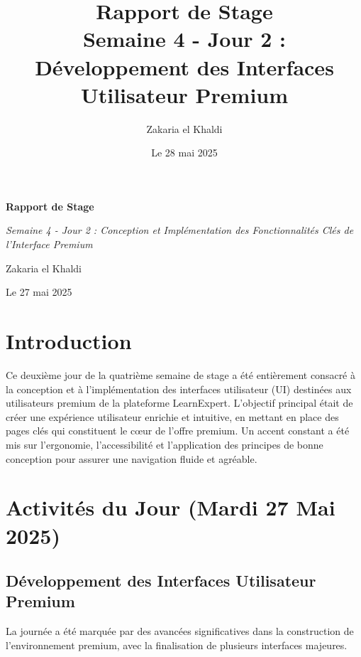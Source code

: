 \documentclass[12pt, a4paper]{article}
\title{\Huge\bfseries\color{primary} Rapport de Stage \\ 
      \Large Semaine 4 - Jour 2 : Développement des Interfaces Utilisateur Premium} %
\author{\Large Zakaria el Khaldi}
\date{\large Le 28 mai 2025} %
\begin{document}
\begin{titlepage}
  \centering
  {\Huge\bfseries\color{primary} Rapport de Stage \par}
  \vspace{1cm}
  {\Large\itshape Semaine 4 - Jour 2 : Conception et Implémentation des Fonctionnalités Clés de l'Interface Premium\par} %
  \vspace{2cm}
  
  \vspace{2cm}
  {\Large Zakaria el Khaldi\par}
  \vfill
  {\large Le 27 mai 2025\par} %
\end{titlepage}

\tableofcontents
\thispagestyle{empty}
\newpage

\section{Introduction}
\thispagestyle{fancy}
Ce deuxième jour de la quatrième semaine de stage a été entièrement consacré à la conception et à l'implémentation des interfaces utilisateur (UI) destinées aux utilisateurs premium de la plateforme LearnExpert. L'objectif principal était de créer une expérience utilisateur enrichie et intuitive, en mettant en place des pages clés qui constituent le cœur de l'offre premium. Un accent constant a été mis sur l'ergonomie, l'accessibilité et l'application des principes de bonne conception pour assurer une navigation fluide et agréable.

\section{Activités du Jour (Mardi 27 Mai 2025)} %

\subsection{Développement des Interfaces Utilisateur Premium}
La journée a été marquée par des avancées significatives dans la construction de l'environnement premium, avec la finalisation de plusieurs interfaces majeures.
\end{document}
